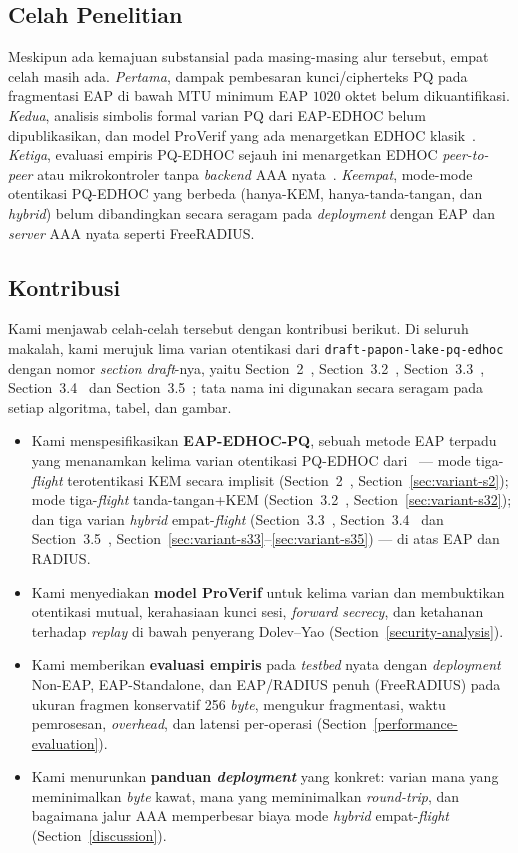 \documentclass{easychair}
\newcommand{\VarSec}[1]{Section~#1~\cite{pq-edhoc-draft}}
\begin{document}
\subsection{Celah Penelitian}
\label{sec:gap-research}
Meskipun ada kemajuan substansial pada masing-masing alur tersebut,
empat celah masih ada. \emph{Pertama}, dampak pembesaran
kunci/cipherteks PQ pada fragmentasi EAP di bawah MTU minimum EAP
$1020$ oktet belum dikuantifikasi. \emph{Kedua}, analisis simbolis
formal varian PQ dari EAP-EDHOC belum dipublikasikan, dan model
ProVerif yang ada menargetkan EDHOC klasik~\cite{NSB21,JKK+23}.
\emph{Ketiga}, evaluasi empiris PQ-EDHOC sejauh ini menargetkan
EDHOC \emph{peer-to-peer} atau mikrokontroler tanpa \emph{backend}
AAA nyata~\cite{FTK+25,FKF25}. \emph{Keempat}, mode-mode otentikasi
PQ-EDHOC yang berbeda (hanya-KEM, hanya-tanda-tangan, dan
\emph{hybrid}) belum dibandingkan secara seragam pada
\emph{deployment} dengan EAP dan \emph{server} AAA nyata seperti
FreeRADIUS.

\subsection{Kontribusi}
\label{sec:contribution}
Kami menjawab celah-celah tersebut dengan kontribusi berikut. Di
seluruh makalah, kami merujuk lima varian otentikasi dari
\texttt{draft-papon-lake-pq-edhoc} dengan nomor \emph{section}
\emph{draft}-nya, yaitu \VarSec{2}, \VarSec{3.2}, \VarSec{3.3},
\VarSec{3.4} dan \VarSec{3.5}; tata nama ini digunakan secara seragam
pada setiap algoritma, tabel, dan gambar.
\begin{itemize}[leftmargin=1.2em,itemsep=2pt,topsep=2pt]
\item Kami menspesifikasikan \textbf{EAP-EDHOC-PQ}, sebuah metode EAP
terpadu yang menanamkan kelima varian otentikasi PQ-EDHOC
dari~\cite{pq-edhoc-draft} --- mode tiga-\emph{flight} terotentikasi
KEM secara implisit (\VarSec{2},
Section~\ref{sec:variant-s2}); mode tiga-\emph{flight} tanda-tangan+KEM
(\VarSec{3.2}, Section~\ref{sec:variant-s32}); dan tiga varian
\emph{hybrid} empat-\emph{flight} (\VarSec{3.3}, \VarSec{3.4} dan
\VarSec{3.5}, Section~\ref{sec:variant-s33}--\ref{sec:variant-s35}) ---
di atas EAP dan RADIUS.
\item Kami menyediakan \textbf{model ProVerif} untuk kelima varian dan
membuktikan otentikasi mutual, kerahasiaan kunci sesi,
\emph{forward secrecy}, dan ketahanan terhadap \emph{replay} di bawah
penyerang Dolev--Yao (Section~\ref{security-analysis}).
\item Kami memberikan \textbf{evaluasi empiris} pada \emph{testbed}
nyata dengan \emph{deployment} Non-EAP, EAP-Standalone, dan EAP/RADIUS
penuh (FreeRADIUS) pada ukuran fragmen konservatif 256 \emph{byte},
mengukur fragmentasi, waktu pemrosesan, \emph{overhead}, dan latensi
per-operasi (Section~\ref{performance-evaluation}).
\item Kami menurunkan \textbf{panduan \emph{deployment}} yang konkret:
varian mana yang meminimalkan \emph{byte} kawat, mana yang meminimalkan
\emph{round-trip}, dan bagaimana jalur AAA memperbesar biaya mode
\emph{hybrid} empat-\emph{flight} (Section~\ref{discussion}).
\end{itemize}
\end{document}

